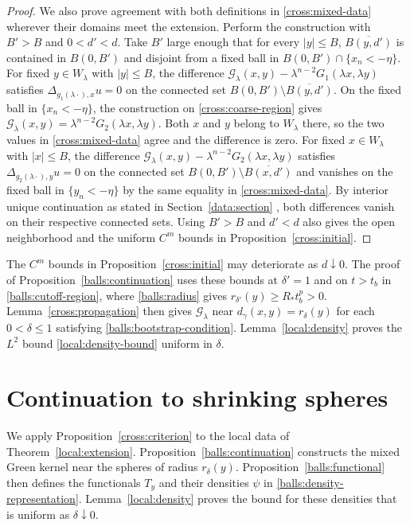 \documentclass[11pt,a4paper]{article}
\theoremstyle{definition}
\theoremstyle{remark}
\numberwithin{equation}{section}
\begin{document}
\begin{proof}
We also prove agreement with both definitions in
\eqref{cross:mixed-data} wherever their domains meet the extension.
Perform the construction with $B'>B$ and $0<d'<d$. Take $B'$ large
enough that for every $|y|\le B$, $\overline{B(y,d')}$ is contained
in $B(0,B')$ and disjoint from a fixed ball in
$B(0,B')\cap\{x_n<-\eta\}$.
For fixed $y\in W_\lambda$ with $|y|\le B$, the difference
$\mathcal G_\lambda(x,y)-\lambda^{n-2}G_1(\lambda x,\lambda y)$
satisfies $\Delta_{g_1(\lambda\cdot),x}u=0$ on the connected set
$B(0,B')\setminus\overline{B(y,d')}$.
On the fixed ball in $\{x_n<-\eta\}$, the construction on
\eqref{cross:coarse-region} gives
$\mathcal G_\lambda(x,y)=\lambda^{n-2}G_2(\lambda x,\lambda y)$.
Both $x$ and $y$ belong to $W_\lambda$ there, so the two values in
\eqref{cross:mixed-data} agree and the difference is zero.
For fixed $x\in W_\lambda$ with $|x|\le B$, the difference
$\mathcal G_\lambda(x,y)-\lambda^{n-2}G_2(\lambda x,\lambda y)$
satisfies $\Delta_{g_2(\lambda\cdot),y}u=0$ on the connected set
$B(0,B')\setminus\overline{B(x,d')}$ and vanishes on the fixed
ball in $\{y_n<-\eta\}$ by the same equality in \eqref{cross:mixed-data}.
By interior unique continuation as stated in Section~\ref{data:section}
\citep[Theorem~8]{KochTataru2005}, both differences vanish on their
respective connected sets.
Using $B'>B$ and $d'<d$ also gives the open neighborhood and the
uniform $C^m$ bounds in Proposition~\ref{cross:initial}.
\end{proof}

The $C^m$ bounds in Proposition~\ref{cross:initial} may deteriorate as
$d\downarrow0$. The proof of Proposition~\ref{balls:continuation}
uses these bounds at $\delta'=1$ and on $t>t_b$ in
\eqref{balls:cutoff-region}, where \eqref{balls:radius} gives
$r_{\delta'}(y)\ge R_*t_b^p>0$. Lemma~\ref{cross:propagation} then
gives $\mathcal G_\lambda$ near $d_\gamma(x,y)=r_\delta(y)$ for each
$0<\delta\le1$ satisfying \eqref{balls:bootstrap-condition}.
Lemma~\ref{local:density} proves the $L^2$ bound
\eqref{local:density-bound} uniform in $\delta$.
\section{Continuation to shrinking spheres}\label{sec:balls}

We apply Proposition~\ref{cross:criterion} to the local data of
Theorem~\ref{local:extension}.
Proposition~\ref{balls:continuation} constructs the mixed Green kernel
near the spheres of radius $r_\delta(y)$.
Proposition~\ref{balls:functional} then defines the functionals $T_y$
and their densities $\psi$ in \eqref{balls:density-representation}.
Lemma~\ref{local:density} proves the bound for these densities that is
uniform as $\delta\downarrow0$.
\end{document}

